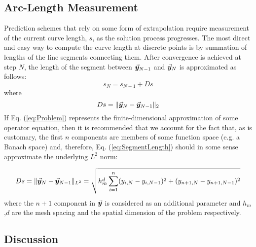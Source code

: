 \subsection{Arc-Length Measurement}
Prediction schemes that rely on some form of extrapolation require measurement 
of the current curve length, $s$, as the solution 
process progresses. The most direct and easy way
to compute the curve length at discrete points is by summation of lengths  
of the line segments connecting them. After convergence is achieved at step $N$,
the length of the segment between $\vec{\bm{y}}_{N-1}$ and $\vec{\bm{y}}_N$ is 
approximated as follows:
\begin{equation}
	s_N=s_{N-1}+Ds
	\label{eq:newS}
\end{equation}
where
\begin{equation}
	Ds = \Vert \vec{\bm{y}}_N-\vec{\bm{y}}_{N-1}\Vert_2
	\label{eq:SegmentLength}
\end{equation}
If Eq. (\ref{eq:Problem}) represents the finite-dimensional approximation of 
some operator
equation, then it is recommended\cite{Keller87} that we account for the fact
that, as is customary, the first $n$ components are members of some function
space (e.g. a Banach space) and, therefore, Eq. (\ref{eq:SegmentLength}) should 
in 
some sense approximate the underlying $L^2$ norm:

\begin{equation}
	Ds = \Vert 
	\vec{\bm{y}}_N-\vec{\bm{y}}_{N-1}\Vert_{L^2}=\sqrt{h_m^d\sum_{i=1}^n(y_{i,N}-y_{i,N-1})^2+(y_{n+1,N}-y_{n+1,N-1})^2}
	\label{eq:INCR}
\end{equation}
where the $n+1$ component in $\vec{\bm{y}}$ is considered as an additional 
parameter and
$h_m$,$d$ are the mesh spacing and the spatial dimension of the problem 
respectively.


\subsection{Discussion}\label{CH5-S3SS2}

